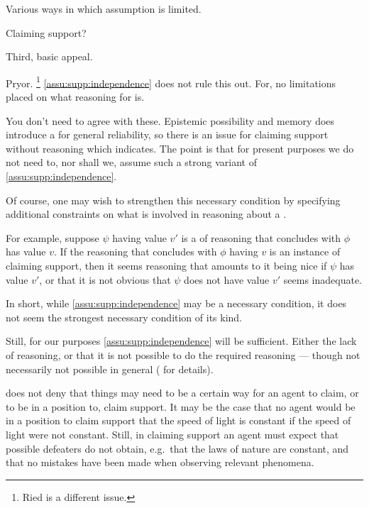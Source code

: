 \begin{note}
  Various ways in which assumption is limited.
\end{note}

\begin{note}
  Claiming support?
\end{note}

\begin{note}
  Third, basic appeal.

  Pryor.\nolinebreak
  \footnote{
    Ried is a different issue.
  }
  \autoref{assu:supp:independence} does not rule this out.
  For, no limitations placed on what reasoning for \requ{} is.
\end{note}

\begin{note}
  You don't need to agree with these.
  Epistemic possibility and memory does introduce a \requ{} for general reliability, so there is an issue for claiming support without reasoning which indicates.
  The point is that for present purposes we do not need to, nor shall we, assume such a strong variant of \autoref{assu:supp:independence}.
\end{note}

\begin{note}[Strengthen?]
  Of course, one may wish to strengthen this necessary condition by specifying additional constraints on what is involved in reasoning about a \requ{}.

  For example, suppose \(\psi\) having value \(v'\) is a \requ{} of reasoning that concludes with \(\phi\) has value \(v\).
  If the reasoning that concludes with \(\phi\) having \(v\) is an instance of claiming support, then it seems reasoning that amounts to it being nice if \(\psi\) has value \(v'\), or that it is not obvious that \(\psi\) does not have value \(v'\) seems inadequate.

  In short, while \autoref{assu:supp:independence} may be a necessary condition, it does not seem the strongest necessary condition of its kind.

  Still, for our purposes \autoref{assu:supp:independence} will be sufficient.
  Either the lack of reasoning, or that it is not possible to do the required reasoning --- though not necessarily not possible in general (\nI{} for details).
\end{note}

\begin{note}
  \eiS{} does not deny that things may need to be a certain way for an agent to claim, or to be in a position to, claim support.
  It may be the case that no agent would be in a position to claim support that the speed of light is constant if the speed of light were not constant.
  Still, in claiming support an agent must expect that possible defeaters do not obtain, e.g.\ that the laws of nature are constant, and that no mistakes have been made when observing relevant phenomena.
\end{note}

